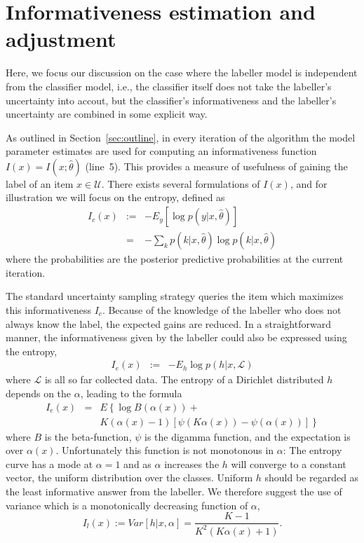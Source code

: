 \documentclass[10pt, onecolumn]{article}
\newcommand{\U}{\mathcal{U}}
\renewcommand{\L}{\mathcal{L}}
\begin{document}



\section{Informativeness estimation and adjustment}
\label{sec:adjustment}

Here, we focus our discussion on the case where the labeller model is
independent from the classifier model, i.e., the classifier itself does not
take the labeller's uncertainty into accout, but the
classifier's informativeness and the labeller's uncertainty are combined in some 
explicit way.

As outlined in Section~\ref{sec:outline}, in every iteration of the
algorithm the model parameter estimates are used for computing an
informativeness function $I(x)=I(x;\hat\theta)$ (line~5). This
provides a measure of usefulness of gaining the label of an item $x\in
\U$. There exists several formulations of $I(x)$, and for illustration we will focus on the entropy, defined as
\begin{eqnarray}
I_c(x)&:=&-E_y [\log p(y|x,\hat\theta)]\\ 
&=&-\sum_k p(k|x,\hat\theta)\log p(k|x,\hat\theta)
\end{eqnarray}
where the probabilities are the posterior predictive probabilities at
the current iteration. 

The standard uncertainty sampling strategy
queries the item which maximizes this informativeness $I_c$. Because of the knowledge of the labeller who does not always know the label, the expected gains are reduced. In a straightforward manner, the informativeness given by the labeller could also be expressed using the entropy,
\begin{eqnarray}
I_e(x)&:=& -E_h \log p(h|x, \L)
\end{eqnarray}
where $\L$ is all so far collected data. The entropy of a Dirichlet
distributed $h$ depends on the $\alpha$, leading to the formula
\begin{eqnarray}
I_e(x)&=& E\left\{ \log B(\alpha(x)) + \right. \\
& &\left. K(\alpha(x)-1)[\psi(K\alpha(x))-\psi(\alpha(x))] \right\}\nonumber
\end{eqnarray}
where $B$ is the beta-function, $\psi$ is the digamma function, and
the expectation is over $\alpha(x)$. Unfortunately this function is
not monotonous in $\alpha$: The entropy curve has a mode at $\alpha=1$ and as $\alpha$ increases the $h$ will converge to a constant vector, the uniform distribution over the classes. Uniform $h$ should be regarded as the least informative answer from the labeller. We therefore suggest the use of variance which is a monotonically decreasing function of $\alpha$,
\[
I_l(x):= Var [h|x, \alpha] = \frac{K-1}{K^2(K\alpha(x)+1)}.
\] 
\end{document}
